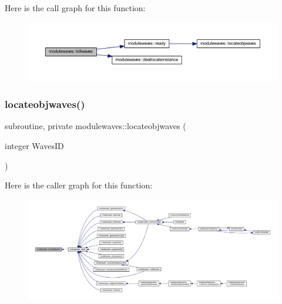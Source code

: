 Here is the call graph for this function\+:\nopagebreak
\begin{figure}[H]
\begin{center}
\leavevmode
\includegraphics[width=350pt]{namespacemodulewaves_ac7cfc1f43634cac51c36130e5d101c5d_cgraph}
\end{center}
\end{figure}
\mbox{\label{namespacemodulewaves_a0b543189e013d4ce00f78f873ab7f481}} 
\subsubsection{\texorpdfstring{locateobjwaves()}{locateobjwaves()}}
{\footnotesize\ttfamily subroutine, private modulewaves\+::locateobjwaves (\begin{DoxyParamCaption}\item[{integer}]{Waves\+ID }\end{DoxyParamCaption})\hspace{0.3cm}{\ttfamily [private]}}

Here is the caller graph for this function\+:\nopagebreak
\begin{figure}[H]
\begin{center}
\leavevmode
\includegraphics[width=350pt]{namespacemodulewaves_a0b543189e013d4ce00f78f873ab7f481_icgraph}
\end{center}
\end{figure}
\mbox{\label{namespacemodulewaves_ad08ecc5e93cabd5c4b166e1af608e044}} 
